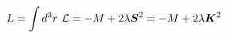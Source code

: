 \begin{equation}
L=\int d^3r~{\cal{L}}=-M+2\lambda \mbox{\boldmath$S$}^2 = -M+2\lambda \mbox{\boldmath$K$}^2
\end{equation} 
